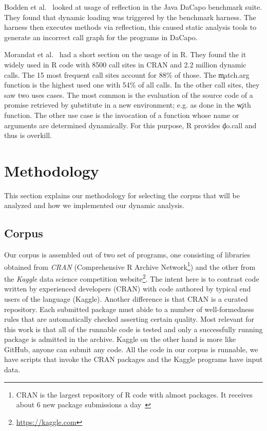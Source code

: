 \documentclass[USenglish,cleveref, autoref, thm-restate]{lipics-v2019}
\begin{document}
Bodden et al.~\cite{bodden} looked at usage of reflection in the Java
DaCapo benchmark suite. They found that dynamic loading was triggered
by the benchmark harness. The harness then executes methods via
reflection, this caused static analysis tools to generate an incorrect
call graph for the programs in DaCapo.

Morandat et al.~\cite{ecoop12} had a short section on the usage of
\eval in R. They found the it widely used in R code with 8500 call
sites in CRAN and 2.2 million dynamic calls. The 15 most frequent call
sites account for 88\% of those. The \c{match.arg} function is the
highest used one with 54\% of all calls. In the other call sites, they
saw two uses cases. The most common is the evaluation of the source
code of a promise retrieved by \c{substitute} in a new environment;
e.g. as done in the \c{with} function. The other use case is the
invocation of a function whose name or arguments are determined
dynamically. For this purpose, R provides \c{do.call} and thus \eval
is overkill.

\section{Methodology}

This section explains our methodology for selecting the corpus that
will be analyzed and how we implemented our dynamic analysis.

\subsection{Corpus}

Our corpus is assembled out of two set of programs, one consisting of libraries
obtained from \emph{CRAN} (Comprehensive R Archive Network\footnote{CRAN is the
  largest repository of R code with almost \CranAvailablePackagesRnd packages.
  It receives about 6 new package submissions a day~\cite{Ligges2017}}) and the
other from the \emph{Kaggle} data science competition website\footnote{\cf
  \url{https://kaggle.com}}. The intent here is to contrast code written by
experienced developers (CRAN) with code authored by typical end users of the
language (Kaggle). Another difference is that CRAN is a curated repository. Each
submitted package must abide to a number of well-formedness rules that are
automatically checked asserting certain quality. Most relevant for this work is
that all of the runnable code is tested and only a successfully running package
is admitted in the archive. Kaggle on the other hand is more like GitHub, anyone
can submit any code. All the code in our corpus is runnable, \ie we have scripts
that invoke the CRAN packages and the Kaggle programs have input data.
\end{document}

